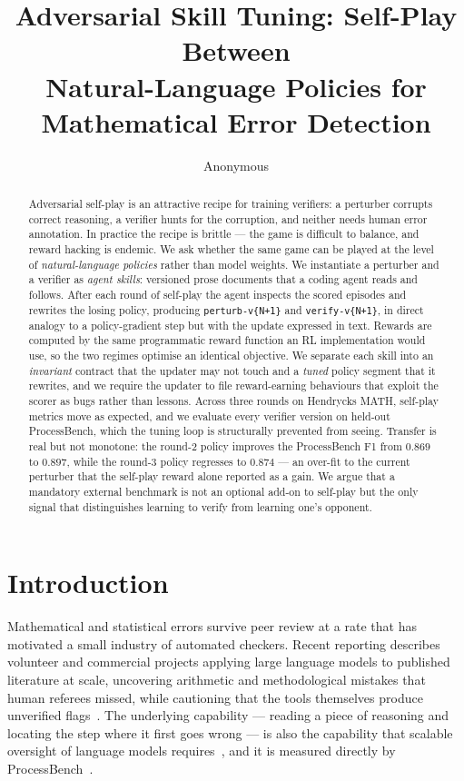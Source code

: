 \documentclass{article} %
\title{Adversarial Skill Tuning: Self-Play Between\\ Natural-Language Policies for Mathematical Error Detection}
\author{Anonymous}
\begin{document}
\maketitle

\begin{abstract}
Adversarial self-play is an attractive recipe for training verifiers: a perturber corrupts
correct reasoning, a verifier hunts for the corruption, and neither needs human error
annotation. In practice the recipe is brittle --- the game is difficult to balance, and
reward hacking is endemic. We ask whether the same game can be played at the level of
\emph{natural-language policies} rather than model weights. We instantiate a perturber and
a verifier as \emph{agent skills}: versioned prose documents that a coding agent reads and
follows. After each round of self-play the agent inspects the scored episodes and rewrites
the losing policy, producing \texttt{perturb-v\{N+1\}} and \texttt{verify-v\{N+1\}}, in
direct analogy to a policy-gradient step but with the update expressed in text. Rewards are
computed by the same programmatic reward function an RL implementation would use, so the
two regimes optimise an identical objective. We separate each skill into an
\emph{invariant} contract that the updater may not touch and a \emph{tuned} policy segment
that it rewrites, and we require the updater to file reward-earning behaviours that exploit
the scorer as bugs rather than lessons. Across three rounds on Hendrycks MATH, self-play
metrics move as expected, and we evaluate every verifier version on held-out ProcessBench,
which the tuning loop is structurally prevented from seeing. Transfer is real but not
monotone: the round-2 policy improves the ProcessBench F1 from $0.869$ to $0.897$, while
the round-3 policy regresses to $0.874$ --- an over-fit to the current perturber that the
self-play reward alone reported as a gain. We argue that a mandatory external benchmark is
not an optional add-on to self-play but the only signal that distinguishes learning to
verify from learning one's opponent.
\end{abstract}

\section{Introduction}

Mathematical and statistical errors survive peer review at a rate that has motivated a
small industry of automated checkers. Recent reporting describes volunteer and commercial
projects applying large language models to published literature at scale, uncovering
arithmetic and methodological mistakes that human referees missed, while cautioning that
the tools themselves produce unverified flags~\citep{gibney2025errors}. The underlying
capability --- reading a piece of reasoning and locating the step where it first goes wrong
--- is also the capability that scalable oversight of language models
requires~\citep{amodei2016concrete,bowman2022measuring,saunders2022self}, and it is
measured directly by ProcessBench~\citep{zheng2024processbench}.
\end{document}
